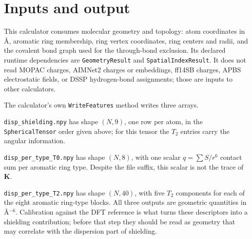 \documentclass[11pt]{article}
\begin{document}
\section{Inputs and output}

This calculator consumes molecular geometry and topology: atom coordinates in
\(\si{\angstrom}\), aromatic ring membership, ring vertex coordinates, ring
centers and radii, and the covalent bond graph used for the through-bond
exclusion. Its declared runtime dependencies are \texttt{GeometryResult} and
\texttt{SpatialIndexResult}. It does not read MOPAC charges, AIMNet2 charges or
embeddings, ff14SB charges, APBS electrostatic fields, or DSSP hydrogen-bond
assignments; those are inputs to other calculators.

The calculator's own \texttt{WriteFeatures} method writes three arrays.

\texttt{disp\_shielding.npy} has shape \((N,9)\), one row per atom, in the
\texttt{SphericalTensor} order given above; for this tensor the \(T_2\)
entries carry the angular information.

\texttt{disp\_per\_type\_T0.npy} has shape \((N,8)\), with one scalar
\(q=\sum S/r^6\) contact sum per aromatic ring type. Despite the file suffix,
this scalar is not the trace of \(\bm K\).

\texttt{disp\_per\_type\_T2.npy} has shape \((N,40)\), with five \(T_2\)
components for each of the eight aromatic ring-type blocks. All three outputs
are geometric quantities in \(\si{\angstrom^{-6}}\).
Calibration against the DFT reference is what turns these descriptors into a
shielding contribution; before that step they should be read as geometry that
may correlate with the dispersion part of shielding.
\end{document}
